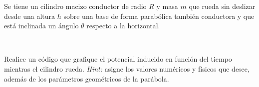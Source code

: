 Se tiene un cilindro macizo conductor de radio $R$ y masa $m$ que rueda sin
deslizar desde una altura $h$ sobre una base de forma parabólica también 
conductora y que está inclinada un ángulo $\theta$ respecto a la horizontal.

\

Realice un código que grafique el potencial inducido en función del tiempo
mientras el cilindro rueda. \textit{Hint:} asigne los valores numéricos y
físicos que desee, además de los parámetros geométricos de la parábola.



